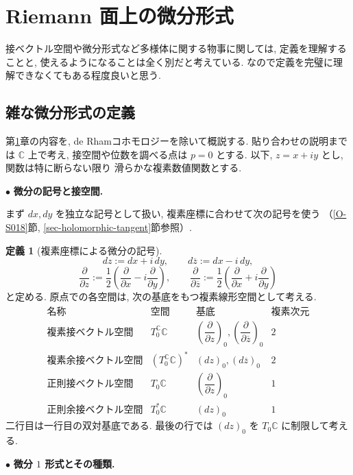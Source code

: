 \documentclass[dvipdfmx,a4paper,11pt]{article} %
\newcommand{\C}{\mathbb{C}}
\theoremstyle{definition}
\numberwithin{equation}{section}
\newtheorem{dfn}[thm]{定義}
\begin{document}
\newpage

\section{Riemann 面上の微分形式}\label{O-S017}
接ベクトル空間や微分形式など多様体に関する物事に関しては, 定義を理解することと, 使えるようになることは全く別だと考えている. なので定義を完璧に理解できなくてもある程度良いと思う. 

\subsection{雑な微分形式の定義}

第\ref{O-S017}章の内容を, de Rhamコホモロジーを除いて概説する.
貼り合わせの説明までは $\C$ 上で考え,
接空間や位数を調べる点は $p=0$ とする.
以下, $z=x+iy$ とし, 関数は特に断らない限り
滑らかな複素数値関数とする.

\medskip
\noindent
$\bullet$ \textbf{微分の記号と接空間.}

まず $dx,dy$ を独立な記号として扱い,
複素座標に合わせて次の記号を使う
（\ref{O-S018}節, \ref{sec-holomorphic-tangent}節参照）.

\begin{dfn}[複素座標による微分の記号]
\[
dz:=dx+i\,dy,\qquad d\overline z:=dx-i\,dy,
\]
\[
\frac{\partial}{\partial z}
:=\frac12\left(
\frac{\partial}{\partial x}-i\frac{\partial}{\partial y}
\right),
\qquad
\frac{\partial}{\partial\overline z}
:=\frac12\left(
\frac{\partial}{\partial x}+i\frac{\partial}{\partial y}
\right)
\]
と定める.
原点での各空間は, 次の基底をもつ複素線形空間として考える.
\[
\begin{array}{c|c|c|c}
\text{名称}&\text{空間}&\text{基底}&\text{複素次元}\\ \hline
\text{複素接ベクトル空間}
&T_0^\C\C
&\left(\dfrac{\partial}{\partial z}\right)_0,
 \left(\dfrac{\partial}{\partial\overline z}\right)_0
&2\\[6pt]
\text{複素余接ベクトル空間}
&(T_0^\C\C)^*
&(dz)_0,(d\overline z)_0
&2\\[2pt]
\text{正則接ベクトル空間}
&T_0\C
&\left(\dfrac{\partial}{\partial z}\right)_0
&1\\[6pt]
\text{正則余接ベクトル空間}
&T_0^*\C
&(dz)_0
&1
\end{array}
\]
二行目は一行目の双対基底である.
最後の行では $(dz)_0$ を $T_0\C$ に制限して考える.
\end{dfn}

\medskip
\noindent
$\bullet$ \textbf{微分 $1$ 形式とその種類.}
\end{document}
